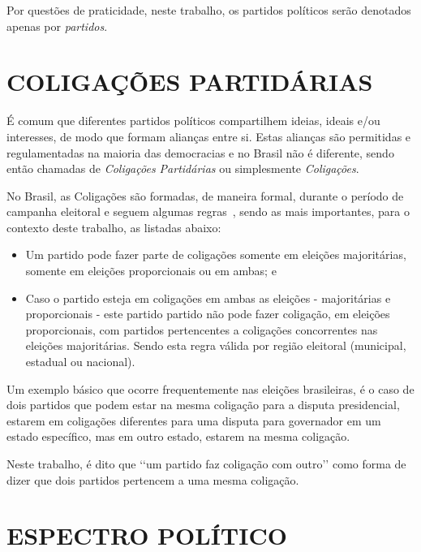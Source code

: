 Por questões de praticidade, neste trabalho, os partidos políticos serão denotados apenas por \emph{partidos}. 


\section{\texorpdfstring{\MakeUppercase{Coligações Partidárias}}{}}
\label{conceitos__coligacoes}

É comum que diferentes partidos políticos compartilhem ideias, ideais e/ou interesses, de modo que formam alianças entre si. Estas alianças são permitidas e regulamentadas na maioria das democracias e no Brasil não é diferente, sendo então chamadas de \emph{Coligações Partidárias} ou simplesmente \emph{Coligações}.

No Brasil, as Coligações são formadas, de maneira formal, durante o período de campanha eleitoral e seguem algumas regras~\cite{brasil1997lei9504}, sendo as mais importantes, para o contexto deste trabalho, as listadas abaixo:

\begin{itemize}
    \item Um partido pode fazer parte de coligações somente em eleições majoritárias, somente em eleições proporcionais ou em ambas; e
    \item Caso o partido esteja em coligações em ambas as eleições - majoritárias e proporcionais - este partido partido não pode fazer coligação, em eleições proporcionais, com partidos pertencentes a coligações concorrentes nas eleições majoritárias. Sendo esta regra válida por região eleitoral (municipal, estadual ou nacional).
\end{itemize}

Um exemplo básico que ocorre frequentemente nas eleições brasileiras, é o caso de dois partidos que podem estar na mesma coligação para a disputa presidencial, estarem em coligações diferentes para uma disputa para governador em um estado específico, mas em outro estado, estarem na mesma coligação.

Neste trabalho, é dito que ‘‘um partido faz coligação com outro’’ como forma de dizer que dois partidos pertencem a uma mesma coligação.


\section{\texorpdfstring{\MakeUppercase{Espectro Político}}{}}
\label{conceitos__espectro-politico}

